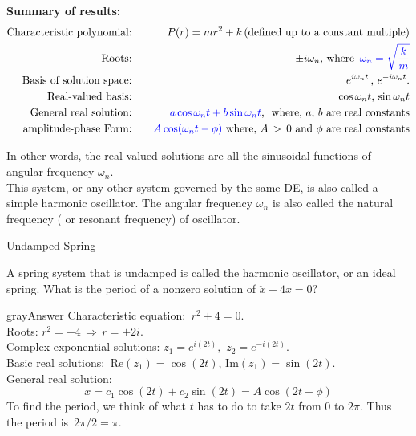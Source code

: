 \textbf{Summary of results:}
\begin{eqnarray*}
  \text{Characteristic polynomial:} & \quad
  & P(r) =  mr^2 + k \, \text{(defined up to a constant multiple)}\\
  \text{Roots:}  & \quad
  & \pm i \omega _ n,\, \text{where } \, {\color{blue}{\omega _ n = \sqrt {\frac{k}{m}} }} \\
  \text{Basis of solution space:} & \quad
  & e^{i \omega _ n t}\, , \, e^{-i\omega _ n t}. \\
  \text{Real-valued basis:} & \quad
  & \cos \omega _ n t, \, \sin \omega _ n t \\
  \text{General real solution:}	& \quad
  & {\color{blue}{ a \cos \omega _ n t + b \sin \omega _ n t}} , \,
    \text{ where, $a, \, b$ are real constants} \\
  \text{amplitude-phase Form:}	& \quad
  & {\color{blue}{A \cos (\omega _ n t - \phi )}}
    \text{ where, $A \, >  \, 0$ and $\phi$ are real constants}     
\end{eqnarray*}

In other words, the real-valued solutions are all the sinusoidal functions of
angular frequency $\omega _n$. \\

This system, or any other system governed by the same DE, is also called a
{\color{blue} simple harmonic oscillator}.
The angular frequency $\omega _n$ is also called the {\color{blue} natural frequency}
( or {\color{blue} resonant frequency}) of oscillator.

\begin{exercise}
  Undamped Spring
\end{exercise}
A spring system that is undamped is called the harmonic oscillator, or an ideal spring.
What is the period of a nonzero solution of $\ddot x + 4x = 0$?
\begin{mybox}{gray}{Answer}
  Characteristic equation:  $r^2 + 4 = 0$. \\
  Roots: $r^2 = -4 \,  \Rightarrow \,  r = \pm 2i$. \\
  Complex exponential solutions: $z_1 = e^{i(2t)} , \, \, z_2 = e^{-i(2t)}$. \\
  Basic real solutions:  $\textrm{Re}(z_1) = \cos (2t)$, $\textrm{Im}(z_1) = \sin (2t)$. \\
  General real solution:
  \begin{equation*}
    x = c_1\cos (2t) + c_2\sin (2t) = A\cos (2t-\phi )
  \end{equation*}
  To find the period, we think of what $t$ has to do to take $2t$ from $0$ to $2 \pi$.
  Thus the period is $\, 2\pi /2=\pi$. 
\end{mybox}
\clearpage

